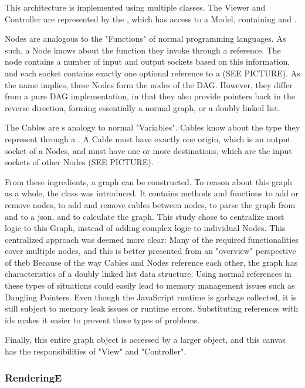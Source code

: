 This architecture is implemented using multiple classes. The Viewer and Controller are represented by the , which has access to a  Model, containing  and . 

Nodes are analogous to the "Functions" of normal programming languages. 
As such, a Node knows about the function they invoke through a  reference. 
The node contains a number of input and output sockets based on this information, and each socket contains exactly one optional reference to a  (SEE PICTURE).  
As the name implies, these Nodes form the nodes of the DAG. However, they differ from a pure DAG implementation, in that they also provide pointers back in the reverse direction, forming essentially a normal graph, or a doubly linked list. 

The Cables are \geofront{}s analogy to normal "Variables". Cables know about the type they represent through a . A Cable must have exactly one origin, which is an output socket of a Nodes, and must have one or more destinations, which are the input sockets of other Nodes (SEE PICTURE).

From these ingredients, a graph can be constructed. 
To reason about this graph as a whole, the  class was introduced. 
It contains methods and functions to add or remove nodes, to add and remove cables between nodes, to parse the graph from and to a json, and to calculate the graph.  
This study chose to centralize most logic to this Graph, instead of adding complex logic to individual Nodes. 
This centralized approach was deemed more clear: Many of the required functionalities cover multiple nodes, and this is better presented from an "overview" perspective of theb 
Because of the way Cables and Nodes reference each other, the graph has characteristics of a doubly linked list data structure. Using normal references in these types of situations could easily lead to memory management issues such as Dangling Pointers. Even though the JavaScript runtime is garbage collected, it is still subject to memory leak issues or runtime errors. Substituting references with ids makes it easier to prevent these types of problems. 

Finally, this entire graph object is accessed by a larger  object, and this canvas has the responsibilities of "View" and "Controller". 

\subsubsection*{RenderingE}

